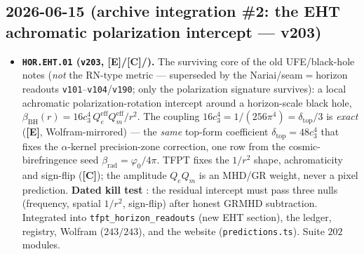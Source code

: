 \documentclass[11pt]{article}
\providecommand{\mE}{\textbf{[E]}}\providecommand{\mC}{\textbf{[C]}}
\providecommand{\vref}[1]{\texttt{#1}}
\begin{document}
\subsection*{2026-06-15 (archive integration \#2: the EHT achromatic polarization intercept --- v203)}
\begin{itemize}
\item \textbf{\texttt{HOR.EHT.01} (\vref{v203}, \mE/\mC/\mX).} The surviving core of the old UFE/black-hole
  notes (\emph{not} the RN-type metric --- superseded by the Nariai/seam$=$horizon readouts
  \vref{v101}--\vref{v104}/\vref{v190}; only the polarization signature survives): a local achromatic
  polarization-rotation intercept around a horizon-scale black hole,
  $\beta_{\mathrm{BH}}(r)=16c_3^4\,Q_e^{\mathrm{eff}}Q_m^{\mathrm{eff}}/r^2$. The coupling
  $16c_3^4=1/(256\pi^4)=\delta_{\mathrm{top}}/3$ is \emph{exact} (\mE, Wolfram-mirrored) --- the \emph{same}
  top-form coefficient $\delta_{\mathrm{top}}=48c_3^4$ that fixes the $\alpha$-kernel precision-zone
  correction, one row from the cosmic-birefringence seed $\beta_{\mathrm{rad}}=\varphi_0/4\pi$. TFPT fixes the
  $1/r^2$ shape, achromaticity and sign-flip (\mC); the amplitude $Q_eQ_m$ is an MHD/GR weight, never a
  pixel prediction. \textbf{Dated kill test \mX}: the residual intercept must pass three nulls (frequency,
  spatial $1/r^2$, sign-flip) after honest GRMHD subtraction. Integrated into \texttt{tfpt\_horizon\_readouts}
  (new EHT section), the ledger, registry, Wolfram ($243/243$), and the website (\texttt{predictions.ts}).
  Suite $202$ modules.
\end{itemize}
\end{document}
